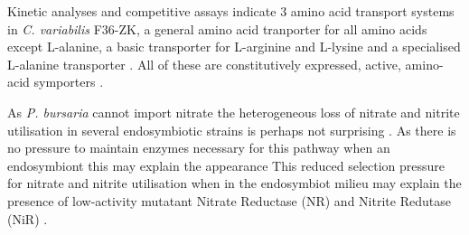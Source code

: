 Kinetic analyses and competitive assays indicate 3 amino acid transport
systems in \textit{C. variabilis} F36-ZK, a general amino acid tranporter
for all amino acids except L-alanine, a basic transporter for L-arginine and L-lysine
and a specialised L-alanine transporter \citep{Kato2009b,Kato2009a}.
All of these are constitutively expressed, active, amino-acid symporters \citep{Kato2009b,Kato2009a}.

%

As \textit{P. bursaria} cannot import nitrate \citep{Albers1982} the heterogeneous
loss of nitrate and nitrite utilisation in several endosymbiotic strains 
is perhaps not surprising \citep{Kato2009a}.
As there is no pressure to maintain enzymes necessary for this pathway when an endosymbiont
this may explain the appearance 
This reduced selection pressure for nitrate and nitrite utilisation when in the endosymbiot
milieu may explain the presence of low-activity mutatant Nitrate Reductase (NR) and Nitrite
Redutase (NiR) \citep{Kato2009a}. 


%
%

%


